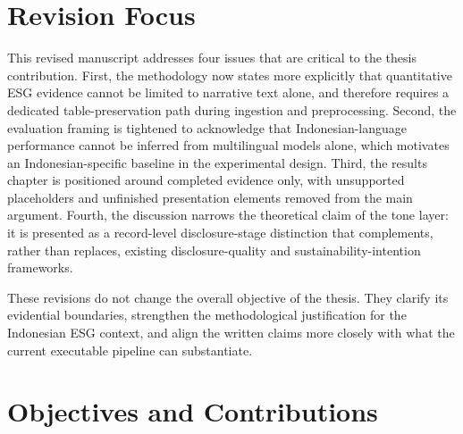 \section{Revision Focus}

This revised manuscript addresses four issues that are critical to the thesis contribution. First, the methodology now states more explicitly that quantitative ESG evidence cannot be limited to narrative text alone, and therefore requires a dedicated table-preservation path during ingestion and preprocessing. Second, the evaluation framing is tightened to acknowledge that Indonesian-language performance cannot be inferred from multilingual models alone, which motivates an Indonesian-specific baseline in the experimental design. Third, the results chapter is positioned around completed evidence only, with unsupported placeholders and unfinished presentation elements removed from the main argument. Fourth, the discussion narrows the theoretical claim of the tone layer: it is presented as a record-level disclosure-stage distinction that complements, rather than replaces, existing disclosure-quality and sustainability-intention frameworks.

These revisions do not change the overall objective of the thesis. They clarify its evidential boundaries, strengthen the methodological justification for the Indonesian ESG context, and align the written claims more closely with what the current executable pipeline can substantiate.

\section{Objectives and Contributions}
